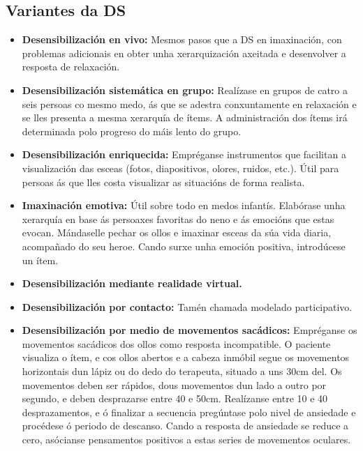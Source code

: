 \documentclass[a4paper,11pt]{article}
\begin{document}
\subsection{Variantes da DS}
\begin{itemize}
	\item \textbf{Desensibilización en vivo:} Mesmos pasos que a DS en imaxinación, con problemas 
	adicionais en obter unha xerarquización axeitada e desenvolver a resposta de relaxación.
	\item \textbf{Desensibilización sistemática en grupo:} Realízase en grupos de catro a seis 
	persoas co mesmo medo, ás que se adestra conxuntamente en relaxación e se lles presenta a mesma 
	xerarquía de ítems. A administración dos ítems irá determinada polo progreso do máis lento do 
	grupo.
	\item \textbf{Desensibilización enriquecida:} Empréganse instrumentos que facilitan a 
	visualización das esceas (fotos, diapositivos, olores, ruidos, etc.). Útil para persoas ás que 
	lles costa visualizar as situacións de forma realista.
	\item \textbf{Imaxinación emotiva:} Útil sobre todo en medos infantís. Elabórase unha xerarquía 
	en base ás persoaxes favoritas do neno e ás emocións que estas evocan. Mándaselle pechar os ollos 
	e imaxinar esceas da súa vida diaria, acompañado do seu heroe. Cando surxe unha emoción positiva, 
	introdúcese un ítem.
	\item \textbf{Desensibilización mediante realidade virtual.}
	\item \textbf{Desensibilización por contacto:} Tamén chamada modelado participativo.
	\item \textbf{Desensibilización por medio de movementos sacádicos:} Empréganse os movementos 
	sacádicos dos ollos como resposta incompatible. O paciente visualiza o ítem, e cos ollos abertos 
	e a cabeza inmóbil segue os movementos horizontais dun lápiz ou do dedo do terapeuta, situado a 
	uns 30cm del. Os movementos deben ser rápidos, dous movementos dun lado a outro por segundo, e 
	deben desprazarse entre 40 e 50cm. Realízanse entre 10 e 40 desprazamentos, e ó finalizar a 
	secuencia pregúntase polo nivel de ansiedade e procédese ó periodo de descanso. Cando a resposta 
	de ansiedade se reduce a cero, asócianse pensamentos positivos a estas series de movementos 
	oculares.
\end{itemize}
\end{document}
